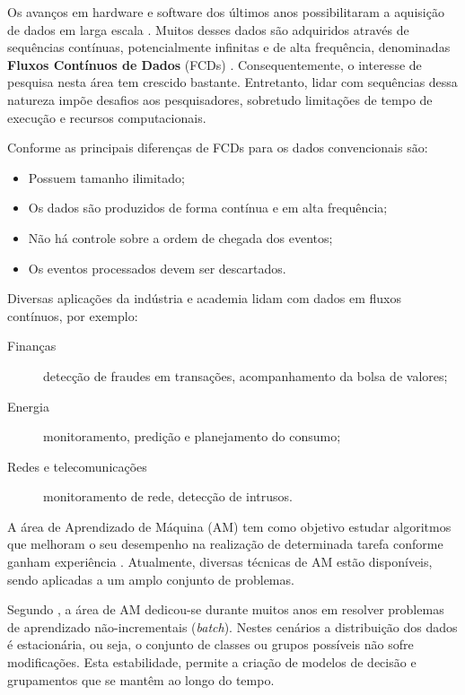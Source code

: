 \documentclass[qual, classic, a4paper]{ufbathesis}
\begin{document}
Os avanços em hardware e software dos últimos anos possibilitaram a aquisição de dados em larga escala \cite{Aggarwal:2003:FCE:1315451.1315460}.
Muitos desses dados são adquiridos através de sequências contínuas, potencialmente infinitas e de alta frequência, 
denominadas \textbf{Fluxos Contínuos de Dados} (FCDs) \cite{Aggarwal:2003:FCE:1315451.1315460, Gama:2010:KDD:1855075, GamaMCR04}.
Consequentemente, o interesse de pesquisa nesta área tem crescido bastante.
Entretanto, lidar com sequências dessa natureza impõe desafios aos pesquisadores, sobretudo limitações de tempo de execução e recursos computacionais.
 
Conforme \cite{Babcock:2002:MID:543613.543615} as principais diferenças de FCDs para os dados convencionais são:
\begin{itemize}
    \item Possuem tamanho ilimitado;
    \item Os dados são produzidos de forma contínua e em alta frequência;
    \item Não há controle sobre a ordem de chegada dos eventos;
    \item Os eventos processados devem ser descartados.
\end{itemize}

Diversas aplicações da indústria e academia lidam com dados em fluxos contínuos, por exemplo:

\begin{description}
    \item[Finanças] detecção de fraudes em transações, acompanhamento da bolsa de valores;
    \item[Energia] monitoramento, predição e planejamento do consumo;
    \item[Redes e telecomunicações] monitoramento de rede, detecção de intrusos.
\end{description}

A área de Aprendizado de Máquina (AM) tem como objetivo estudar algoritmos que melhoram o seu desempenho na realização de determinada tarefa conforme ganham experiência \cite{Mitchell:1997:ML:541177}.
Atualmente, diversas técnicas de AM estão disponíveis, sendo aplicadas a um amplo conjunto de problemas.

Segundo \cite{Gama:2010:KDD:1855075}, a área de AM dedicou-se durante muitos anos em resolver problemas de aprendizado não-incrementais (\textit{batch}).
Nestes cenários a distribuição dos dados é estacionária, ou seja, o conjunto de classes ou grupos possíveis não sofre modificações.
Esta estabilidade, permite a criação de modelos de decisão e grupamentos que se mantêm ao longo do tempo.
\end{document}
